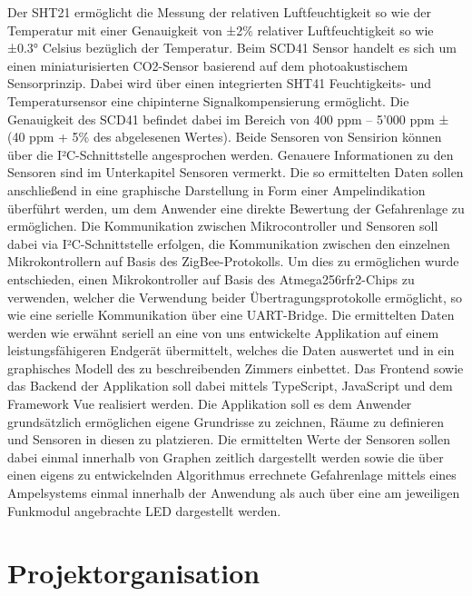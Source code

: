 \documentclass[]{article}
\begin{document}
	Der SHT21 ermöglicht die Messung der relativen Luftfeuchtigkeit so wie der Temperatur mit einer Genauigkeit von ±2\% relativer Luftfeuchtigkeit so wie ±0.3° Celsius bezüglich der Temperatur.\newline
	Beim SCD41 Sensor handelt es sich um einen miniaturisierten CO2-Sensor basierend auf dem photoakustischem Sensorprinzip. Dabei wird über einen integrierten SHT41 Feuchtigkeits- und Temperatursensor eine chipinterne Signalkompensierung ermöglicht. Die Genauigkeit des SCD41 befindet dabei im Bereich von 400 ppm – 5’000 ppm ± (40 ppm + 5\% des abgelesenen Wertes). Beide Sensoren von Sensirion können über die I²C-Schnittstelle angesprochen werden. Genauere Informationen zu den Sensoren sind im Unterkapitel Sensoren vermerkt.\newline
	Die so ermittelten Daten sollen anschließend in eine graphische Darstellung in Form einer Ampelindikation überführt werden, um dem Anwender eine direkte Bewertung der Gefahrenlage zu ermöglichen. Die Kommunikation zwischen Mikrocontroller und Sensoren soll dabei via I²C-Schnittstelle erfolgen, die Kommunikation zwischen den einzelnen Mikrokontrollern auf Basis des ZigBee-Protokolls. Um dies zu ermöglichen wurde entschieden, einen Mikrokontroller auf Basis des Atmega256rfr2-Chips zu verwenden, welcher die Verwendung beider Übertragungsprotokolle ermöglicht, so wie eine serielle Kommunikation über eine UART-Bridge. Die ermittelten Daten werden wie erwähnt seriell an eine von uns entwickelte Applikation auf einem leistungsfähigeren Endgerät übermittelt, welches die Daten auswertet und in ein graphisches Modell des zu beschreibenden Zimmers einbettet. Das Frontend sowie das Backend der Applikation soll dabei mittels TypeScript, JavaScript und dem Framework Vue realisiert werden. Die Applikation soll es dem Anwender grundsätzlich ermöglichen eigene Grundrisse zu zeichnen, Räume zu definieren und Sensoren in diesen zu platzieren. Die ermittelten Werte der Sensoren sollen dabei einmal innerhalb von Graphen zeitlich dargestellt werden sowie die über einen eigens zu entwickelnden Algorithmus errechnete Gefahrenlage mittels eines Ampelsystems einmal innerhalb der Anwendung als auch über eine am jeweiligen Funkmodul angebrachte LED dargestellt werden. 
	
	\section{Projektorganisation}
\end{document}
